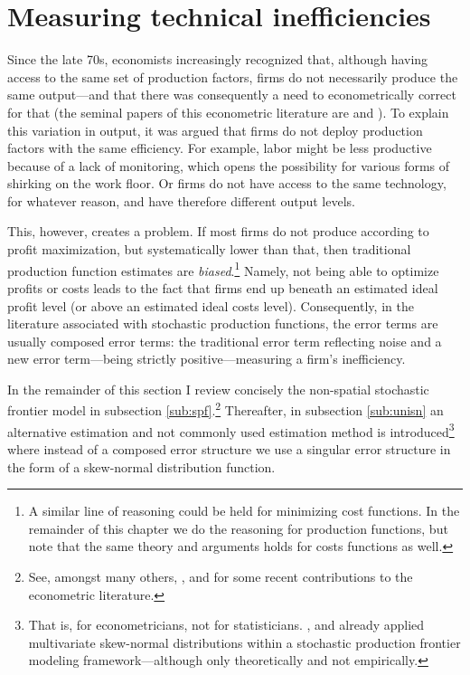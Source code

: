 \documentclass[11pt,parskip,abstracton,notitlepage]{scrartcl}
\begin{document}
\section{Measuring technical inefficiencies}
%
Since the late 70s, economists increasingly recognized that, although having access to the same set of production factors, firms do not necessarily produce the same output---and that there was consequently a need to econometrically correct for that (the seminal papers of this econometric literature are \citet{AIGNER1977} and \citet{MEEUSEN1977}). To explain this variation in output, it was argued that firms do not deploy production factors with the same efficiency. For example, labor might be less productive because of a lack of monitoring, which opens the possibility for various forms of shirking on the work floor. Or firms do not have access to the same technology, for whatever reason, and have therefore different output levels.

This, however, creates a problem. If most firms do not produce according to profit maximization, but systematically lower than that, then traditional production function estimates are \emph{biased}.\footnote{A similar line of reasoning could be held for minimizing cost functions. In the remainder of this chapter we do the reasoning for production functions, but note that the same theory and arguments holds for costs functions as well.} Namely, not being able to optimize profits or costs leads to the fact that firms end up beneath an estimated ideal profit level (or above an estimated ideal costs level). Consequently, in the literature associated with stochastic production functions, the error terms are usually composed error terms: the traditional error term reflecting noise and a new error term---being strictly positive---measuring a firm's inefficiency.

In the remainder of this section I review concisely the non-spatial stochastic frontier model in subsection \ref{sub:spf}.\footnote{See, amongst many others, \cite{KUMBHAKAR2000}, \cite{KUMBHAKAR2006, WANG2009} and \cite{WANG2010} for some recent contributions to the econometric literature.} Thereafter, in subsection \ref{sub:unisn} an alternative estimation and not commonly used estimation method is introduced\footnote{That is, for econometricians, not for statisticians. \citet{molina2003skew}, \citet{gupta2004multivariate} and \citet{dominguez2007matrix} already applied multivariate skew-normal distributions within a stochastic production frontier modeling framework---although only theoretically and not empirically. } where instead of a composed error structure we use a singular error structure in the form of a skew-normal distribution function. 
%
\end{document}
